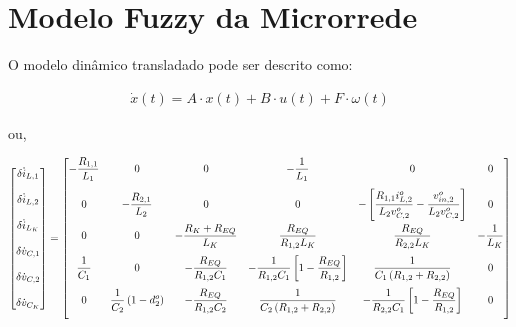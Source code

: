 \section*{Modelo Fuzzy da Microrrede}

O modelo dinâmico transladado pode ser descrito como:

\begin{gather*}
    \dot{x}(t) = A \cdot x(t) + B \cdot u(t) + F \cdot \omega(t)
\end{gather*}

ou,

\begin{gather}
  \begin{bmatrix}
    \delta \dot{i}_{L,1} \\[12pt] \delta \dot{i}_{L,2} \\[12pt] \delta \dot{i}_{L_K} \\[12pt]
    \delta \dot{v}_{C,1} \\[12pt] \delta \dot{v}_{C,2} \\[12pt] \delta \dot{v}_{C_K}
  \end{bmatrix} =
  \begin{bmatrix}
    \displaystyle - \frac{R_{1,1}}{L_1} & 0                         & 0                                         & \displaystyle - \frac{1}{L_1}                  & 0                                    & 0                           \\[12pt]
    0                         & \displaystyle - \frac{R_{2,1}}{L_2} & 0                                         & 0                                    & \displaystyle - \left[ \frac{R_{1,1} i_{L,2}^o}{L_2 v_{C,2}^o} - \frac{v_{in,2}^o}{L_2 v_{C,2}^o} \right]                  & 0                           \\[12pt]
    0                         & 0                         & - \displaystyle \frac{R_K + R_{EQ}}{L_K}   & \displaystyle \frac{R_{EQ}}{R_{1,2} L_K}              & \displaystyle \frac{R_{EQ}}{R_{2,2} L_K}              & - \displaystyle \frac{1}{L_K}         \\[12pt]
    \displaystyle \frac{1}{C_1}         & 0                         & \displaystyle - \frac{R_{EQ}}{R_{1,2} C_1}                 & \displaystyle - \frac{1}{R_{1,2}C_1} \left[ 1 - \frac{R_{EQ}}{R_{1,2}} \right] & \displaystyle \frac{1}{C_1 \left(R_{1,2} + R_{2,2}\right)}       & 0                           \\[12pt]
    0                         & \displaystyle \frac{1}{C_2} \left( 1 - d_2^o \right)         & \displaystyle - \frac{R_{EQ}}{R_{1,2} C_2} & \displaystyle \frac{1}{C_2 \left(R_{1,2} + R_{2,2}\right)}      & \displaystyle - \frac{1}{R_{2,2}C_1} \left[ 1 - \frac{R_{EQ}}{R_{1,2}} \right] & 0                           \\[12pt]

\end{bmatrix}
\end{gather}
